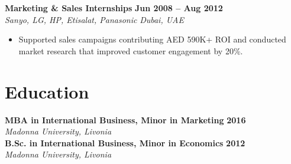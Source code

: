 \documentclass[10pt,a4paper]{article}
\begin{document}
\noindent\textbf{Marketing \& Sales Internships} \hfill \textbf{Jun 2008 -- Aug 2012}\\
\textit{Sanyo, LG, HP, Etisalat, Panasonic} \hfill \textit{Dubai, UAE}
\begin{itemize}[leftmargin=*,nosep,topsep=2pt]
  \item Supported sales campaigns contributing AED 590K+ ROI and conducted market research that improved customer engagement by 20\%.
\end{itemize}

\section{Education}
\noindent\textbf{MBA in International Business, Minor in Marketing} \hfill \textbf{2016}\\
\textit{Madonna University, Livonia}\\
\vspace{2pt}
\noindent\textbf{B.Sc. in International Business, Minor in Economics} \hfill \textbf{2012}\\
\textit{Madonna University, Livonia}
\end{document}
